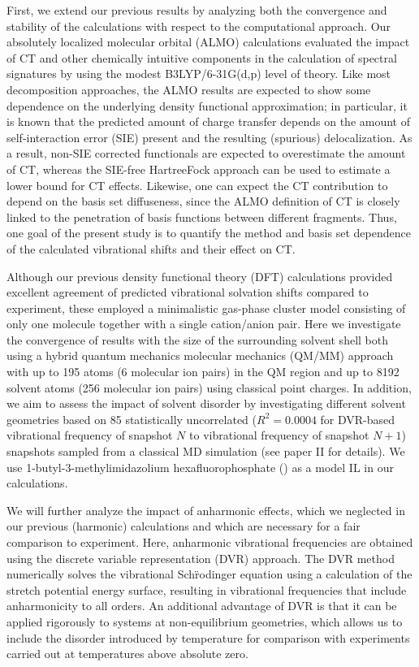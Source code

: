 First, we extend our previous results by analyzing both the convergence and stability of the calculations with respect to the computational approach. Our absolutely localized molecular orbital (ALMO) calculations\cite{Khaliullin2006,Khaliullin2007,Khaliullin2008} evaluated the impact of CT and other chemically intuitive components in the calculation of spectral signatures by using the modest B3LYP/6-31G(d,p) level of theory. Like most decomposition approaches, the ALMO results are expected to show some dependence on the underlying density functional approximation; in particular, it is known that the predicted amount of charge transfer depends on the amount of self-interaction error (SIE) present and the resulting (spurious) delocalization\cite{Ramos-Cordoba2011}. As a result, non-SIE corrected functionals are expected to overestimate the amount of CT, whereas the SIE-free Hartree\textendash{}Fock approach can be used to estimate a lower bound for CT effects. Likewise, one can expect the CT contribution to depend on the basis set diffuseness, since the ALMO definition of CT is closely linked to the penetration of basis functions between different fragments. Thus, one goal of the present study is to quantify the method and basis set dependence of the calculated vibrational shifts and their effect on CT.

Although our previous density functional theory (DFT) calculations provided excellent agreement of predicted vibrational solvation shifts compared to experiment, these employed a minimalistic gas-phase cluster model consisting of only one  molecule together with a single cation/anion pair. Here we investigate the convergence of results with the size of the surrounding solvent shell both using a hybrid quantum mechanics molecular mechanics (QM/MM) approach with up to \num{195} atoms (\num{6} molecular ion pairs) in the QM region and up to \num{8192} solvent atoms (\num{256} molecular ion pairs) using classical point charges. In addition, we aim to assess the impact of solvent disorder by investigating different solvent geometries based on \num{85} statistically uncorrelated (\(R^2 = 0.0004\) for DVR-based vibrational frequency of snapshot \(N\) to vibrational frequency of snapshot \(N+1\)) snapshots sampled from a classical MD simulation (see paper II\cite{Daly2016} for details). We use 1-butyl-3-methylimidazolium hexafluorophosphate (\ce{[C4C1im][PF6]}) as a model IL in our calculations.

We will further analyze the impact of anharmonic effects, which we neglected in our previous (harmonic) calculations and which are necessary for a fair comparison to experiment. Here, anharmonic vibrational frequencies are obtained using the discrete variable representation (DVR) approach. The DVR method numerically solves the vibrational Schr\"{}odinger equation using a calculation of the  stretch potential energy surface, resulting in vibrational frequencies that include anharmonicity to all orders. An additional advantage of DVR is that it can be applied rigorously to systems at non-equilibrium geometries, which allows us to include the disorder introduced by temperature for comparison with experiments carried out at temperatures above absolute zero.

